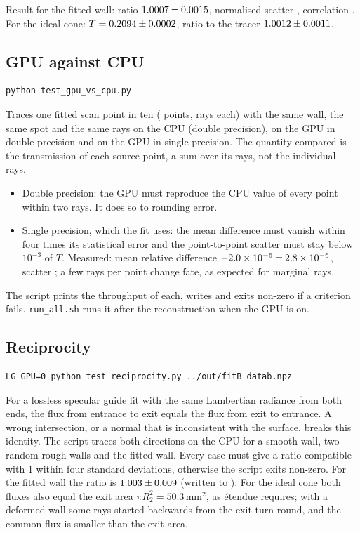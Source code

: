\documentclass[11pt,a4paper]{article}
\newcommand{\code}[1]{\texttt{#1}}
\begin{document}
Result for the fitted wall: ratio $1.0007\pm0.0015$, normalised scatter \GfourPull,
correlation \GfourCorr. For the ideal cone: $T=0.2094\pm0.0002$, ratio to the tracer
$1.0012\pm0.0011$.

\subsection{GPU against CPU}

\begin{lstlisting}
python test_gpu_vs_cpu.py
\end{lstlisting}
Traces one fitted scan point in ten (\GpuNpoints{} points, \GpuNray{} rays each) with the same wall,
the same spot and the same rays on the CPU (double precision), on the GPU in double precision and on
the GPU in single precision. The quantity compared is the transmission of each source point, a sum
over its rays, not the individual rays.
\begin{itemize}
\item Double precision: the GPU must reproduce the CPU value of every point within two rays. It does
so to rounding error.
\item Single precision, which the fit uses: the mean difference must vanish within four times its
statistical error and the point-to-point scatter must stay below $10^{-3}$ of $T$. Measured: mean
relative difference $-2.0\times10^{-6}\pm2.8\times10^{-6}$, scatter \GpuRmsDiff; a few rays per point
change fate, as expected for marginal rays.
\end{itemize}
The script prints the throughput of each, writes  and exits non-zero if a
criterion fails. \code{run\_all.sh} runs it after the reconstruction when the GPU is on.

\subsection{Reciprocity}

\begin{lstlisting}
LG_GPU=0 python test_reciprocity.py ../out/fitB_datab.npz
\end{lstlisting}
For a lossless specular guide lit with the same Lambertian radiance from both ends, the flux from
entrance to exit equals the flux from exit to entrance. A wrong intersection, or a normal that is
inconsistent with the surface, breaks this identity. The script traces both directions on the CPU for
a smooth wall, two random rough walls and the fitted wall. Every case must give a ratio compatible
with 1 within four standard deviations, otherwise the script exits non-zero. For the fitted wall the
ratio is $1.003\pm0.009$ (written to ). For the ideal cone
both fluxes also equal the exit area $\pi R_2^2=50.3$\,mm$^2$, as \'etendue requires; with a deformed
wall some rays started backwards from the exit turn round, and the common flux is smaller than the
exit area.
\end{document}
